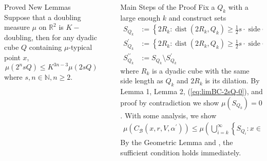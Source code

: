 \documentclass[final]{beamer}
\newlength{\sepwidth}
\newlength{\colwidth}
\newcommand{\separatorcolumn}{\begin{column}{\sepwidth}\end{column}}
\newcommand{\rr}{\mathbb R}
\newcommand{\nn}{\mathbb N}
\newcommand{\calB}{\mathcal B}
\newcommand{\dist}{\operatorname{dist}}
\newcommand{\side}{\operatorname{side}}
\begin{document}
\begin{frame}[t]
\begin{columns}[t]
\begin{column}{\colwidth}
\begin{block}{Proved New Lemmas}
    Suppose that a doubling measure $\mu$ on $\rr^2$ is $K-$doubling, then for any dyadic cube $Q$ containing $\mu$-typical point $x$, 
    \begin{equation}\label{eq:doubling4cubes}
        \mu(2^n sQ)\leq K^{3n-3} \mu(2sQ)
    \end{equation}
    where $s, n\in \nn, n\geq 2$.
    \end{block}
\end{column}


\separatorcolumn

\begin{column}{\colwidth}


    \begin{block}{Main Steps of the Proof}
    Fix a $Q_k$ with a large enough $k$ and construct sets
    {\small{
    \begin{equation*}
        \begin{split}
            S_{Q_k} &:= \left\{2R_k: \dist(2R_k, Q_k)\geq \frac{1}{2}s\cdot\side Q_k, 2R_k\cap(2sQ_k\cap C_\calB^{I, 1} (Q_k, V, \alpha^\prime))\neq \emptyset\right\} \\
            S_{Q_k}^\prime &:= \left\{2R_k: \dist(2R_k, Q_k)\geq \frac{1}{2}s\cdot\side Q_k, 2R_k\subset 2sQ_k\cap C_\calB^{I, 1} (Q_k, V, \alpha^\prime)\right\} \\
            S_{Q_k}^{\prime\prime} &:= S_{Q_k} \setminus S_{Q_k}^\prime
        \end{split}
    \end{equation*}
    }}
    where $R_k$ is a dyadic cube with the same side length as $Q_k$ and $2R_k$ is its dilation. By Lemma {\color{violet}1}, Lemma {\color{violet}2}, (\ref{eq:limBC-2sQ-0}), and proof by contradiction we show $\mu(S_{Q_k}) = 0$. With some analysis, we show 
    \begin{equation*}
        \begin{split}
            \mu(C_\calB(x, r, V, \alpha^\prime))\leq \mu\left( \bigcup_{i=k}^\infty \left\{S_{Q_i}:x\in Q_i\subset Q_k \right)\}\right) = 0
        \end{split}
    \end{equation*}
  By the Geometric Lemma and \cite[Corollary 7.1]{naples2020rectifiability}, the sufficient condition holds immediately. 
    

\end{block}
\end{column}
\end{columns}
\end{frame}
\end{document}
